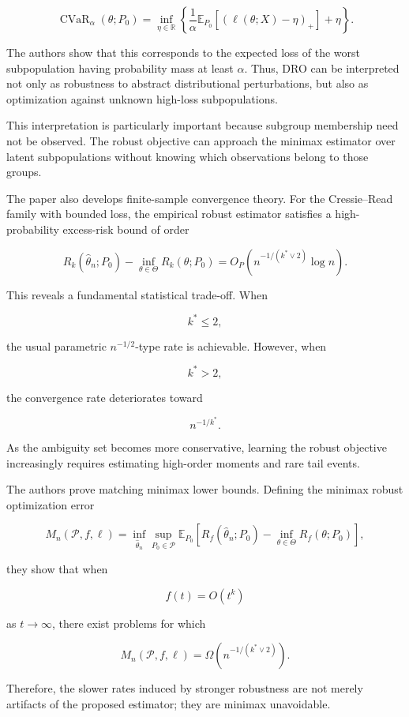 \documentclass[11pt]{article}
\begin{document}
\[
\operatorname{CVaR}_{\alpha}(\theta;P_0)
=
\inf_{\eta\in\mathbb{R}}
\left\{
\frac{1}{\alpha}
\mathbb{E}_{P_0}
\left[
\left(
\ell(\theta;X)-\eta
\right)_+
\right]
+
\eta
\right\}.
\]

The authors show that this corresponds to the expected loss of the worst subpopulation having probability mass at least \(\alpha\). Thus, DRO can be interpreted not only as robustness to abstract distributional perturbations, but also as optimization against unknown high-loss subpopulations.

This interpretation is particularly important because subgroup membership need not be observed. The robust objective can approach the minimax estimator over latent subpopulations without knowing which observations belong to those groups.

The paper also develops finite-sample convergence theory. For the Cressie--Read family with bounded loss, the empirical robust estimator satisfies a high-probability excess-risk bound of order

\[
R_k(\widehat{\theta}_n;P_0)
-
\inf_{\theta\in\Theta}
R_k(\theta;P_0)
=
O_P
\left(
n^{-1/(k^*\vee 2)}
\log n
\right).
\]

This reveals a fundamental statistical trade-off. When

\[
k^*\leq2,
\]

the usual parametric \(n^{-1/2}\)-type rate is achievable. However, when

\[
k^*>2,
\]

the convergence rate deteriorates toward

\[
n^{-1/k^*}.
\]

As the ambiguity set becomes more conservative, learning the robust objective increasingly requires estimating high-order moments and rare tail events.

The authors prove matching minimax lower bounds. Defining the minimax robust optimization error

\[
M_n(\mathcal{P},f,\ell)
=
\inf_{\widehat{\theta}_n}
\sup_{P_0\in\mathcal{P}}
\mathbb{E}_{P_0}
\left[
R_f(\widehat{\theta}_n;P_0)
-
\inf_{\theta\in\Theta}
R_f(\theta;P_0)
\right],
\]

they show that when

\[
f(t)=O(t^k)
\]

as \(t\rightarrow\infty\), there exist problems for which

\[
M_n(\mathcal{P},f,\ell)
=
\Omega
\left(
n^{-1/(k^*\vee2)}
\right).
\]

Therefore, the slower rates induced by stronger robustness are not merely artifacts of the proposed estimator; they are minimax unavoidable.
\end{document}
